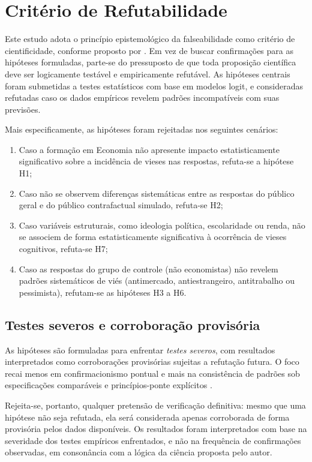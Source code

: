 \section{Critério de Refutabilidade}

Este estudo adota o princípio epistemológico da falseabilidade como critério de cientificidade, conforme proposto por . Em vez de buscar confirmações para as hipóteses formuladas, parte-se do pressuposto de que toda proposição científica deve ser logicamente testável e empiricamente refutável. As hipóteses centrais foram submetidas a testes estatísticos com base em modelos logit, e consideradas refutadas caso os dados empíricos revelem padrões incompatíveis com suas previsões.

Mais especificamente, as hipóteses foram rejeitadas nos seguintes cenários:

\begin{enumerate}[label=\alph*)]

    \item Caso a formação em Economia não apresente impacto estatisticamente significativo sobre a incidência de vieses nas respostas, refuta-se a hipótese H1;
    \item Caso não se observem diferenças sistemáticas entre as respostas do público geral e do público contrafactual simulado, refuta-se H2;
    \item Caso variáveis estruturais, como ideologia política, escolaridade ou renda, não se associem de forma estatisticamente significativa à ocorrência de vieses cognitivos, refuta-se H7;
    \item Caso as respostas do grupo de controle (não economistas) não revelem padrões sistemáticos de viés (antimercado, antiestrangeiro, antitrabalho ou pessimista), refutam-se as hipóteses H3 a H6.
    
\end{enumerate}

\subsection{Testes severos e corroboração provisória}
As hipóteses são formuladas para enfrentar \textit{testes severos}, com resultados interpretados como corroborações provisórias sujeitas a refutação futura. O foco recai menos em confirmacionismo pontual e mais na consistência de padrões sob especificações comparáveis e princípios-ponte explícitos \cite{hausman2008,stigum2003}.

Rejeita-se, portanto, qualquer pretensão de verificação definitiva: mesmo que uma hipótese não seja refutada, ela será considerada apenas corroborada de forma provisória pelos dados disponíveis. Os resultados foram interpretados com base na severidade dos testes empíricos enfrentados, e não na frequência de confirmações observadas, em consonância com a lógica da ciência proposta pelo autor.


